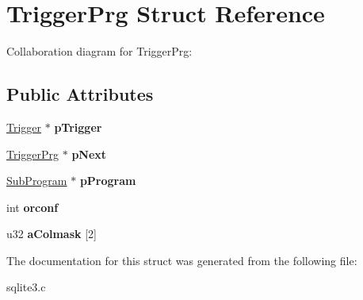 \hypertarget{structTriggerPrg}{}\section{Trigger\+Prg Struct Reference}
\label{structTriggerPrg}


Collaboration diagram for Trigger\+Prg\+:
\subsection*{Public Attributes}
\begin{DoxyCompactItemize}
\item 
\hyperlink{structTrigger}{Trigger} $\ast$ {\bfseries p\+Trigger}\hypertarget{structTriggerPrg_af70e5a74c954bc7a1eb8ee1162c40368}{}\label{structTriggerPrg_af70e5a74c954bc7a1eb8ee1162c40368}

\item 
\hyperlink{structTriggerPrg}{Trigger\+Prg} $\ast$ {\bfseries p\+Next}\hypertarget{structTriggerPrg_a551b8a29a8c4ff785afab1596e5d8710}{}\label{structTriggerPrg_a551b8a29a8c4ff785afab1596e5d8710}

\item 
\hyperlink{structSubProgram}{Sub\+Program} $\ast$ {\bfseries p\+Program}\hypertarget{structTriggerPrg_aa770aee270c7c5df85578dc4a6686134}{}\label{structTriggerPrg_aa770aee270c7c5df85578dc4a6686134}

\item 
int {\bfseries orconf}\hypertarget{structTriggerPrg_aa475acda58c472b3491f6aa17020bf68}{}\label{structTriggerPrg_aa475acda58c472b3491f6aa17020bf68}

\item 
u32 {\bfseries a\+Colmask} \mbox{[}2\mbox{]}\hypertarget{structTriggerPrg_aeac0a4cd1f1d287981ae33c4d171b614}{}\label{structTriggerPrg_aeac0a4cd1f1d287981ae33c4d171b614}

\end{DoxyCompactItemize}


The documentation for this struct was generated from the following file\+:\begin{DoxyCompactItemize}
\item 
sqlite3.\+c\end{DoxyCompactItemize}
